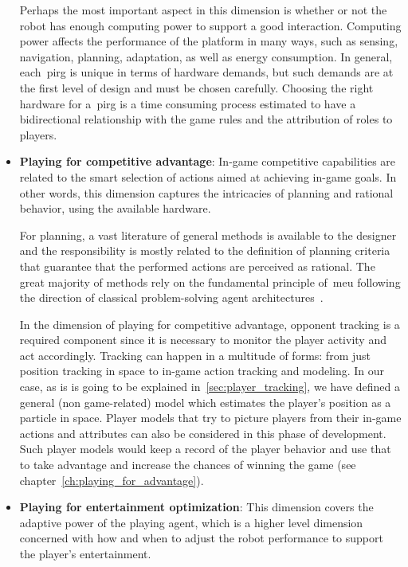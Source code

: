 \begin{itemize}[leftmargin=*,labelsep=5.8mm]
Perhaps the most important aspect in this dimension is whether or not the robot has enough computing power to support a good interaction. Computing power affects the performance of the platform in many ways, such as sensing, navigation, planning, adaptation, as well as energy consumption. In general, each~\gls{pirg} is unique in terms of hardware demands, but such demands are at the first level of design and must be chosen carefully. Choosing the right hardware for a~\gls{pirg} is a time consuming process estimated to have a bidirectional relationship with the game rules and the attribution of roles to players.

\item \textbf{Playing for competitive advantage}: In-game competitive capabilities are related to the smart selection of actions aimed at achieving in-game goals. In other words, this dimension captures the intricacies of planning and rational behavior, using the available hardware. 

For planning, a vast literature of general methods is available to the designer and the responsibility is mostly related to the definition of planning criteria that guarantee that the performed actions are perceived as rational. The great majority of methods rely on the fundamental principle of~\gls{meu} following the direction of classical problem-solving agent architectures~\citep{russell_artificial_2009}.

In the dimension of playing for competitive advantage, opponent tracking is a required component since it is necessary to monitor the player activity and act accordingly. Tracking can happen in a multitude of forms: from just position tracking in space to in-game action tracking and modeling. In our case, as is is going to be explained in~\ref{sec:player_tracking}, we have defined a general (non game-related) model which estimates the player's position as a particle in space. Player models that try to picture players from their in-game actions and attributes can also be considered in this phase of development. Such player models would keep a record of the player behavior and use that to take advantage and increase the chances of winning the game (see chapter~\ref{ch:playing_for_advantage}).

\item \textbf{Playing for entertainment optimization}: This dimension covers the adaptive power of the playing agent, which is a higher level dimension concerned with how and when to adjust the robot performance to support the player's entertainment. 


\end{itemize}
